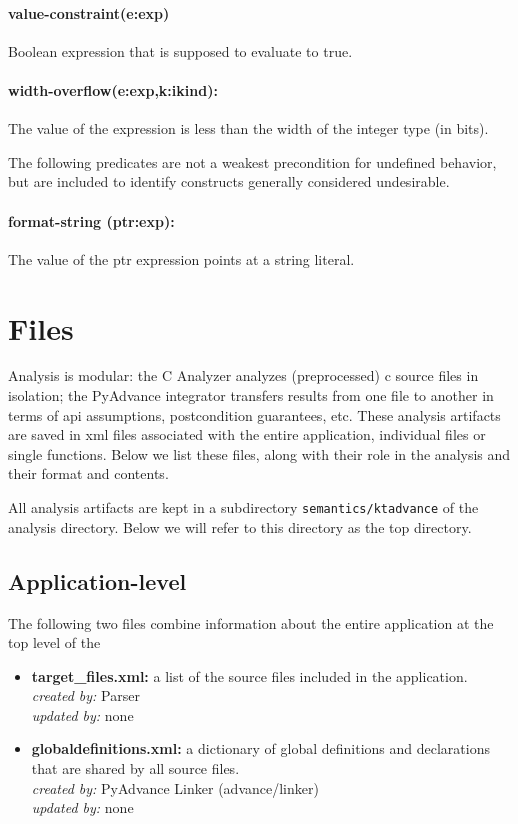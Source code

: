 \documentclass[11pt]{article}
\begin{document}
\paragraph{value-constraint(e:exp)}
Boolean expression that is supposed to evaluate to true.

\paragraph{width-overflow(e:exp,k:ikind):}
The value of the expression is less than the width of the integer type
(in bits).

The following predicates are not a weakest precondition for undefined behavior, but
are included to identify constructs generally considered undesirable.

\paragraph{format-string (ptr:exp): }
The value of the ptr expression points at a string literal.


\section{Files}

Analysis is modular: the C Analyzer analyzes (preprocessed) c source files
in isolation; the PyAdvance integrator transfers results from one file to
another in terms of api assumptions, postcondition guarantees, etc. These
analysis artifacts are saved in xml files associated with the entire
application, individual files or single functions.
Below we list these files, along with their role in the analysis and their
format and contents.

All analysis artifacts are kept in a subdirectory {\tt semantics/ktadvance}
of the analysis directory.
Below we will refer to this directory as the top directory.

\subsection{Application-level}

The following two files combine information about the entire application
at the top level of the 

\begin{itemize}[leftmargin=*]
\item {\bf target\_files.xml: } a list of the source files included in the
  application. \\
  \emph{created by:} Parser \\
  \emph{updated by:} none
\item {\bf globaldefinitions.xml:} a dictionary of global definitions and declarations
  that are shared by all source files. \\
  \emph{created by:} PyAdvance Linker  (advance/linker) \\
  \emph{updated by:} none
\end{itemize}
\end{document}
